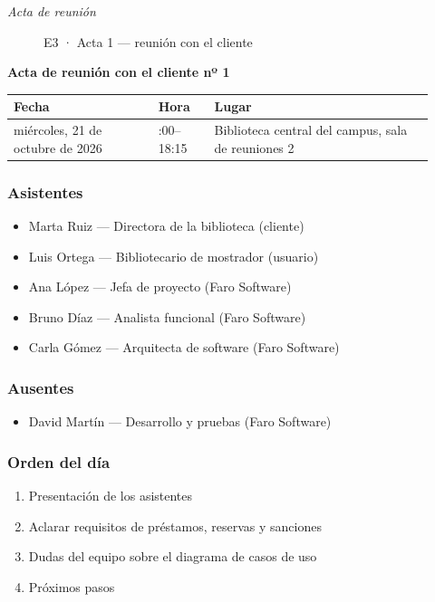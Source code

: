 \emph{Acta de reunión}

\begin{figure}[H]
\centering
{}
\caption{E3 · Acta 1 — reunión con el cliente}
\end{figure}

\textbf{Acta de reunión con el cliente nº 1}

{\small
\begin{longtable}{@{}>{\raggedright\arraybackslash}p{0.317\linewidth}>{\raggedright\arraybackslash}p{0.129\linewidth}>{\raggedright\arraybackslash}p{0.478\linewidth}@{}}
\toprule
\textbf{Fecha} & \textbf{Hora} & \textbf{Lugar} \\
\midrule
\endhead
miércoles, 21 de octubre de 2026 & 17:00–18:15 & Biblioteca central del campus, sala de reuniones 2 \\
\bottomrule
\end{longtable}}

\subsubsection*{Asistentes}

\begin{itemize}
\item Marta Ruiz — Directora de la biblioteca (cliente)
\item Luis Ortega — Bibliotecario de mostrador (usuario)
\item Ana López — Jefa de proyecto (Faro Software)
\item Bruno Díaz — Analista funcional (Faro Software)
\item Carla Gómez — Arquitecta de software (Faro Software)
\end{itemize}

\subsubsection*{Ausentes}

\begin{itemize}
\item David Martín — Desarrollo y pruebas (Faro Software)
\end{itemize}

\subsubsection*{Orden del día}

\begin{enumerate}
\item Presentación de los asistentes
\item Aclarar requisitos de préstamos, reservas y sanciones
\item Dudas del equipo sobre el diagrama de casos de uso
\item Próximos pasos
\end{enumerate}

